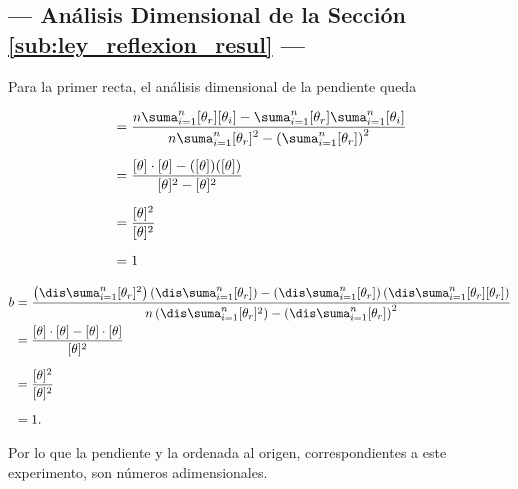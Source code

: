 \documentclass[12pt,a4paper]{article}
\begin{document}
\subsection{--- Análisis Dimensional de la Sección \ref{sub:ley_reflexion_resul} ---} %
\label{sub:analisis_dim_reflexion}
Para la primer recta, el análisis dimensional de la pendiente queda\\
\begin{minipage}{0.5\linewidth}
\begin{align*}
	[a]&=\dfrac{n\displaystyle\suma_{i=1}^{n}[\theta_r][\theta_i]-\displaystyle\suma_{i=1}^{n}[\theta_r]\displaystyle\suma_{i=1}^{n}[\theta_i]}{n\displaystyle\suma_{i=1}^{n}[\theta_r]^2-\left(\displaystyle\suma_{i=1}^{n}[\theta_r]\right)^2}\\[2mm]
	&=\dfrac{[\theta]\cdot[\theta]-([\theta])([\theta])}{[\theta]^2-[\theta]^2}\\[2mm]
	&=\dfrac{[\theta]^2}{[\theta]^2}\\[2mm]
	&=1
\end{align*}
\end{minipage}\hspace{5mm}
\begin{minipage}{0.5\linewidth}
\begin{align*}
		b&=\dfrac{\left(\dis\suma_{i=1}^n [\theta_r]^2\right)\left(\dis\suma_{i=1}^n [\theta_r]\right)-\left(\dis\suma_{i=1}^n [\theta_r] \right)\left(\dis\suma_{i=1}^n [\theta_r] [\theta_r]\right) }{n \left(\dis\suma_{i=1}^n [\theta_r]^2\right)-\left(\dis\suma_{i=1}^n [\theta_r]\right)^2} \\
		&= \dfrac{[\theta] \cdot [\theta] - [\theta] \cdot [\theta]}{[\theta] ^2} \\[2mm]
		&= \dfrac{[\theta] ^2}{[\theta] ^2} \\[2mm]
		&= 1.
\end{align*}
\end{minipage}
Por lo que la pendiente y la ordenada al origen, correspondientes a este experimento, son números adimensionales.
\end{document}
